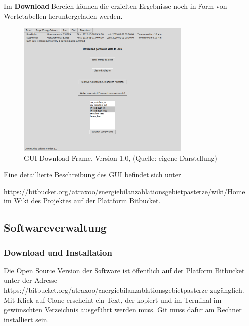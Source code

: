 \documentclass[11pt,a4paper]{article}
\newcommand{\guiplotsize}{0.75}
\newcommand{\guiversion}{1.0}
\begin{document}
Im \textbf{Download}-Bereich können die erzielten Ergebnisse noch in Form von Wertetabellen heruntergeladen werden.

\begin{figure}[H]
\centering
\includegraphics[width=\guiplotsize\textwidth]{pictures/GUI/Download_Frame.png}
\caption[GUI Download-Frame, Version \guiversion]{GUI Download-Frame, Version \guiversion, (Quelle: eigene Darstellung)}
\label{fig:GUI Download-Frame}
\end{figure}

Eine detaillierte Beschreibung des GUI befindet sich unter

\textsf{\small https://bitbucket.org/atraxoo/energiebilanzablationsgebietpasterze/wiki/Home}
 im Wiki des Projektes auf der Plattform Bitbucket.


\subsection{Softwareverwaltung}
\subsubsection{Download und Installation}
Die Open Source Version der Software ist öffentlich auf der  Platform Bitbucket unter der Adresse \textsf{\small https://bitbucket.org/atraxoo/energiebilanzablationsgebietpasterze} zugänglich. Mit Klick auf Clone erscheint ein Text, der kopiert und im Terminal im gewünschten Verzeichnis ausgeführt werden muss. Git muss dafür am Rechner installiert sein.\\
\end{document}
